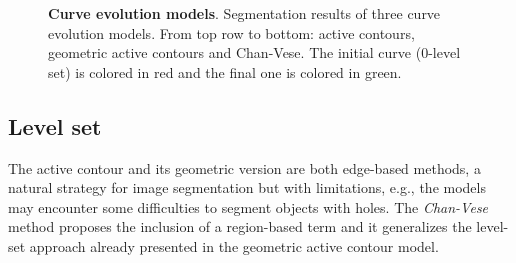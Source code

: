 \begin{figure}
\center
{}\hspace{2em}%
\hspace{2em}%
%
\caption{\textbf{Curve evolution models}. Segmentation results of three curve evolution models. From top row to bottom: active contours, geometric active contours and Chan-Vese. The initial curve ($0$-level set) is colored in red and the final one is colored in green.}
\label{ch1:fig:comparison-curve-evolution}
\end{figure}


\subsection{Level set}
	The active contour and its geometric version are both edge-based methods, a natural strategy for image segmentation but with limitations, e.g., the models may encounter some difficulties to segment objects with holes. The \emph{Chan-Vese} method proposes the inclusion of a region-based term and it generalizes the level-set approach already presented in the geometric active contour model. 
	
